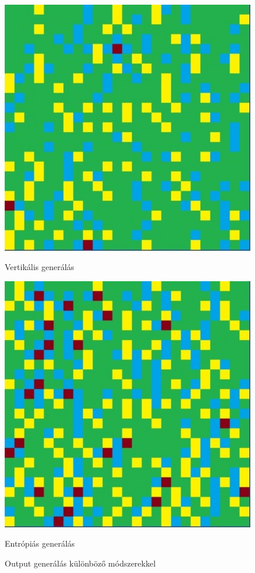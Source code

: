 \begin{figure}[h]
\begin{minipage}{.5\textwidth}
  \includegraphics[width=0.99\textwidth]{images/vertical.jpg}
  \caption{Vertikális generálás}
  \label{fig:wfc-vertical}
\end{minipage}
\begin{minipage}{.5\textwidth}
  \centering
  \includegraphics[width=0.99\textwidth]{images/entropy.jpg}
  \caption{Entrópiás generálás}
  \label{fig:wfc-entropy}
\end{minipage}
\caption*{Output generálás különböző módszerekkel}
\end{figure}